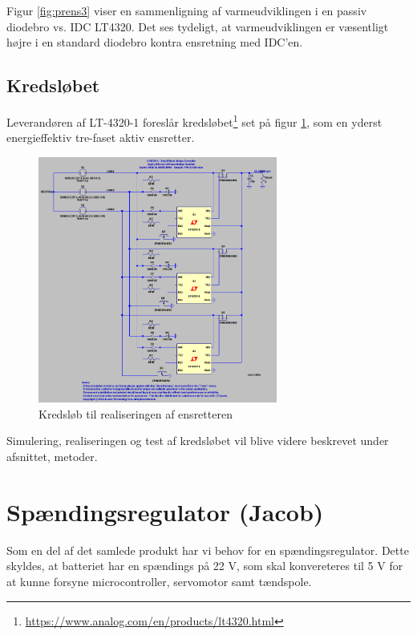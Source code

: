 Figur \ref{fig:prens3} viser en sammenligning af varmeudviklingen i en passiv diodebro vs. IDC LT4320. Det ses tydeligt, at varmeudviklingen er væsentligt højre i en standard diodebro kontra ensretning med IDC'en.  
\clearpage
\subsection{Kredsløbet}
\label{sec:kredslobet}

Leverandøren af LT-4320-1 foreslår kredsløbet\footnote{\url{https://www.analog.com/en/products/lt4320.html}} set på figur \ref{fig:prens2}, som en yderst energieffektiv tre-faset aktiv ensretter.

\begin{figure}[h]
  \centering
  \includegraphics[width=0.7\textwidth]{./figurer/prens4.png}
  \caption{Kredsløb til realiseringen af ensretteren}
  \label{fig:prens2}
\end{figure}

Simulering, realiseringen og test af kredsløbet vil blive videre beskrevet under afsnittet, metoder.


\section{Spændingsregulator (Jacob)}
\label{sec:spandingsforstarker}

Som en del af det samlede produkt har vi behov for en spændingsregulator. Dette skyldes, at batteriet har en spændings på 22 V, som skal konvereteres til 5 V for at kunne forsyne microcontroller, servomotor samt tændspole. %

